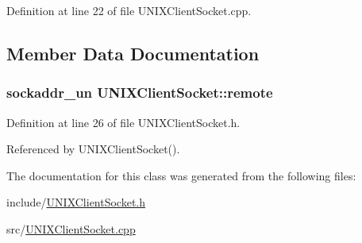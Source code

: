Definition at line 22 of file U\+N\+I\+X\+Client\+Socket.\+cpp.



\subsection{Member Data Documentation}
\hypertarget{classUNIXClientSocket_a78c19c12f8befc559e916b41262d5f6e}{
\subsubsection[{remote}]{\setlength{\rightskip}{0pt plus 5cm}sockaddr\+\_\+un U\+N\+I\+X\+Client\+Socket\+::remote\hspace{0.3cm}{\ttfamily [private]}}}\label{classUNIXClientSocket_a78c19c12f8befc559e916b41262d5f6e}


Definition at line 26 of file U\+N\+I\+X\+Client\+Socket.\+h.



Referenced by U\+N\+I\+X\+Client\+Socket().



The documentation for this class was generated from the following files\+:\begin{DoxyCompactItemize}
\item 
include/\hyperlink{UNIXClientSocket_8h}{U\+N\+I\+X\+Client\+Socket.\+h}\item 
src/\hyperlink{UNIXClientSocket_8cpp}{U\+N\+I\+X\+Client\+Socket.\+cpp}\end{DoxyCompactItemize}
